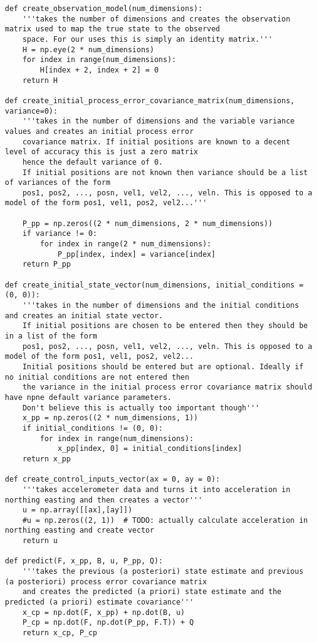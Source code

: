 \documentclass{article}
\begin{document}
\begin{lstlisting}
def create_observation_model(num_dimensions):
    '''takes the number of dimensions and creates the observation matrix used to map the true state to the observed
    space. For our uses this is simply an identity matrix.'''
    H = np.eye(2 * num_dimensions)
    for index in range(num_dimensions):
        H[index + 2, index + 2] = 0
    return H

def create_initial_process_error_covariance_matrix(num_dimensions, variance=0):
    '''takes in the number of dimensions and the variable variance values and creates an initial process error
    covariance matrix. If initial positions are known to a decent level of accuracy this is just a zero matrix
    hence the default variance of 0.
    If initial positions are not known then variance should be a list of variances of the form
    pos1, pos2, ..., posn, vel1, vel2, ..., veln. This is opposed to a model of the form pos1, vel1, pos2, vel2...'''

    P_pp = np.zeros((2 * num_dimensions, 2 * num_dimensions))
    if variance != 0:
        for index in range(2 * num_dimensions):
            P_pp[index, index] = variance[index]
    return P_pp

def create_initial_state_vector(num_dimensions, initial_conditions = (0, 0)):
    '''takes in the number of dimensions and the initial conditions and creates an initial state vector.
    If initial positions are chosen to be entered then they should be in a list of the form
    pos1, pos2, ..., posn, vel1, vel2, ..., veln. This is opposed to a model of the form pos1, vel1, pos2, vel2...
    Initial positions should be entered but are optional. Ideally if no initial conditions are not entered then
    the variance in the initial process error covariance matrix should have npne default variance parameters.
    Don't believe this is actually too important though'''
    x_pp = np.zeros((2 * num_dimensions, 1))
    if initial_conditions != (0, 0):
        for index in range(num_dimensions):
            x_pp[index, 0] = initial_conditions[index]
    return x_pp

def create_control_inputs_vector(ax = 0, ay = 0):
    '''takes accelerometer data and turns it into acceleration in northing easting and then creates a vector'''
    u = np.array([[ax],[ay]])
    #u = np.zeros((2, 1))  # TODO: actually calculate acceleration in northing easting and create vector
    return u

def predict(F, x_pp, B, u, P_pp, Q):
    '''takes the previous (a posteriori) state estimate and previous (a posteriori) process error covariance matrix
    and creates the predicted (a priori) state estimate and the predicted (a priori) estimate covariance'''
    x_cp = np.dot(F, x_pp) + np.dot(B, u)
    P_cp = np.dot(F, np.dot(P_pp, F.T)) + Q
    return x_cp, P_cp


\end{lstlisting}
\end{document}
